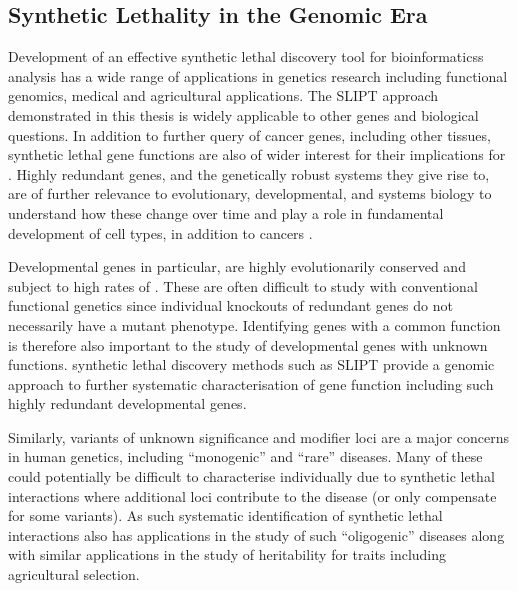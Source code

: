 \subsection{Synthetic Lethality in the Genomic Era}
\label{chapt6:significance_genetics}

Development of an effective \gls{synthetic lethal} discovery tool for \glspl{bioinformatics} analysis has a wide range of applications in genetics research including functional \glspl{genomic}, medical and agricultural applications.  The \gls{SLIPT} approach demonstrated in this thesis is widely applicable to other genes and biological questions. In addition to further query of cancer genes, including other tissues, \gls{synthetic lethal} gene functions are also of wider interest for their implications for . Highly redundant genes, and the genetically robust systems they give rise to, are of further relevance to evolutionary, developmental, and systems biology to understand how these change over time and play a role in fundamental development of cell types, in addition to cancers \citep{Nowak1997, Boone2007, Tischler2008}.

Developmental genes in particular, are highly evolutionarily conserved and subject to high rates of  \citep{Nowak1997, Kockel1997,Fromental-Ramain1996}. These are often difficult to study with conventional functional genetics since individual knockouts of redundant genes do not necessarily have a \gls{mutant} phenotype. Identifying genes with a common function is therefore also important to the study of developmental genes with unknown functions. \Gls{synthetic lethal} discovery methods such as \gls{SLIPT} provide a \gls{genomic} approach to further systematic characterisation of gene function including such highly redundant developmental genes.

Similarly, variants of unknown significance and modifier loci are a major concerns in human genetics, including ``monogenic'' and ``rare'' diseases. Many of these could potentially be difficult to characterise individually due to \gls{synthetic lethal} interactions where additional loci contribute to the disease (or only compensate for some variants). As such systematic identification of \gls{synthetic lethal} interactions also has applications in the study of such ``oligogenic'' diseases along with similar applications in the study of heritability for traits including agricultural  selection.

